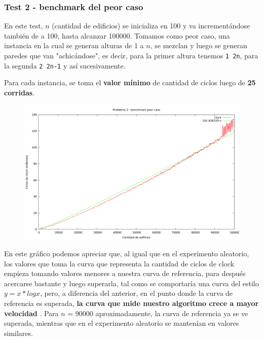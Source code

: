 \newpage


\subsubsection{Test 2 - benchmark del peor caso}

En este test, $n$ (cantidad de edificios) se inicializa en 100 y va incrementándose también de a 100, 
hasta alcanzar 100000. Tomamos como peor caso, una instancia en la cual se generan alturas de 1 a $n$, 
se mezclan y luego se generan paredes que van "achicándose", es decir, para la primer altura tenemos 
\verb|1 2n|, para la segunda \verb|2 2n-1| y así sucesivamente.
 
Para cada instancia, se toma el \textbf{valor mínimo} de cantidad de ciclos luego de \textbf{25 corridas}.

\vspace*{0.5cm}

\begin{figure}[h]
  \begin{center}
    \includegraphics[scale=0.35]{imagenes/grafico-2-peor.png}
  \end{center}
\end{figure}

\vspace*{0.5cm}

En este gráfico podemos apreciar que, al igual que en el experimento aleatorio, los valores que toma la curva 
que representa la cantidad de ciclos de clock empieza tomando valores menores a nuestra curva de referencia, 
para después acercarse bastante y luego superarla, tal como se comportaría una curva del estilo $y = x*log x$, 
pero, a diferencia del anterior, en el punto donde la curva de referencia es superada, \textbf{la curva que mide nuestro 
algoritmo crece a mayor velocidad} . Para $n$ = 90000 aproximadamente, la curva de referencia ya se ve superada, 
mientras que en el experimento aleatorio se mantenían en valores similares.



